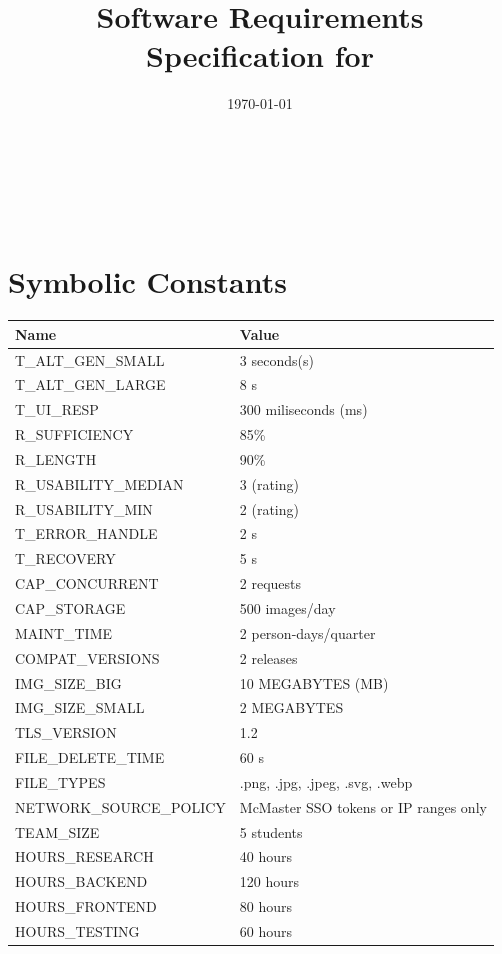 \documentclass[12pt]{article}
\begin{document}
\title{Software Requirements Specification for \progname}
\author{\authname}
\date{\today}

\maketitle

~\newpage


\tableofcontents
~\newpage

\section*{Symbolic Constants}
\begin{longtable}{|p{8.0cm}|p{8.0cm}|}
\toprule
{\textbf{Name}} & {\textbf{Value}}\\
\midrule
T\_ALT\_GEN\_SMALL & 3 seconds(s) \\
T\_ALT\_GEN\_LARGE & 8 s \\
T\_UI\_RESP & 300 miliseconds (ms) \\
R\_SUFFICIENCY & 85\% \\
R\_LENGTH & 90\% \\
R\_USABILITY\_MEDIAN & 3 (rating) \\
R\_USABILITY\_MIN & 2 (rating) \\
T\_ERROR\_HANDLE & 2 s \\
T\_RECOVERY & 5 s \\
CAP\_CONCURRENT & 2 requests \\
CAP\_STORAGE & 500 images/day \\
MAINT\_TIME & 2 person-days/quarter \\
COMPAT\_VERSIONS & 2 releases \\
IMG\_SIZE\_BIG & 10 MEGABYTES (MB) \\
IMG\_SIZE\_SMALL & 2 MEGABYTES \\
TLS\_VERSION & 1.2 \\ 
FILE\_DELETE\_TIME & 60 s \\
FILE\_TYPES & .png, .jpg, .jpeg, .svg, .webp \\
NETWORK\_SOURCE\_POLICY & McMaster SSO tokens or IP ranges only\\
TEAM\_SIZE & 5 students \\
HOURS\_RESEARCH & 40 hours \\
HOURS\_BACKEND & 120 hours \\
HOURS\_FRONTEND & 80 hours \\
HOURS\_TESTING & 60 hours \\

\end{longtable}
\end{document}
